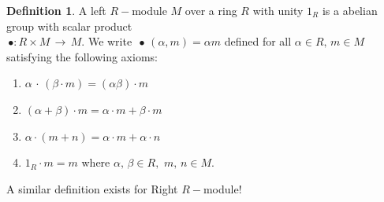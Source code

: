 \documentclass[11pt,a4paper]{article}
\theoremstyle{definition}
\newtheorem{defn}[thm]{Definition}
\begin{document}
\begin{defn}
A left $R-$module $M$ over a ring $R$ with unity $1_R$ is a abelian group with scalar product\\ $\, \bullet : R \times M \, \longrightarrow \, M$. We write $\, \bullet\, (\alpha , m) = \alpha m$ defined for all $\alpha \in R,\, m\in M\,$ satisfying the following axioms:
\begin{enumerate}
\item[(i)] $\alpha \, \cdot\, (\beta\cdot m) = (\alpha \beta)\cdot m$
\item[(ii)] $(\alpha + \beta ) \cdot m = \alpha \cdot m + \beta \cdot m$
\item[(iii)] $\alpha \cdot (m + n) = \alpha \cdot m  + \alpha \cdot n$
\item[(iv)] $1_R\cdot m = m$ where $\alpha,\, \beta \in R,\,\, m,\, n\in M$.
\end{enumerate}

A similar definition exists for Right $R-$module!\\\\
\end{defn}
\end{document}
